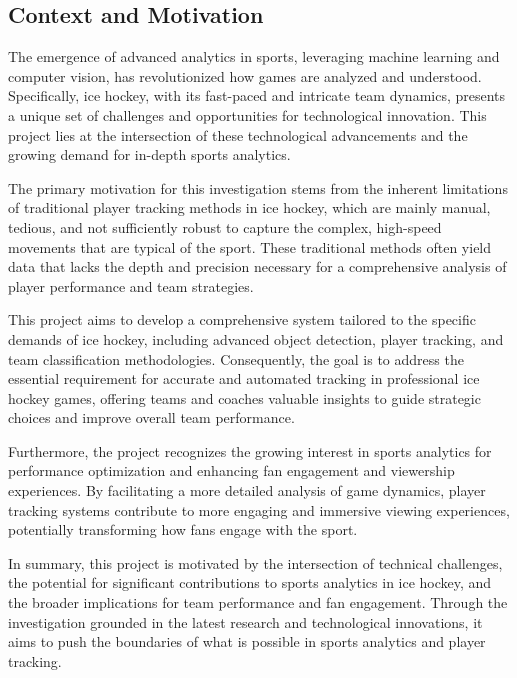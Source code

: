 \documentclass[12pt, letterpaper]{article}
\begin{document}
{
\setlength{\parskip}{0.3cm}
\subsection{Context and Motivation}
\begin{spacing}{1.2}
The emergence of advanced analytics in sports, leveraging machine learning and computer vision, has revolutionized how games are analyzed and understood. Specifically, ice hockey, with its fast-paced and intricate team dynamics, presents a unique set of challenges and opportunities for technological innovation. This project lies at the intersection of these technological advancements and the growing demand for in-depth sports analytics.

The primary motivation for this investigation stems from the inherent limitations of traditional player tracking methods in ice hockey, which are mainly manual, tedious, and not sufficiently robust to capture the complex, high-speed movements that are typical of the sport. These traditional methods often yield data that lacks the depth and precision necessary for a comprehensive analysis of player performance and team strategies.


This project aims to develop a comprehensive system tailored to the specific demands of ice hockey, including advanced object detection, player tracking, and team classification methodologies. Consequently, the goal is to address the essential requirement for accurate and automated tracking in professional ice hockey games, offering teams and coaches valuable insights to guide strategic choices and improve overall team performance.

Furthermore, the project recognizes the growing interest in sports analytics for performance optimization and enhancing fan engagement and viewership experiences. By facilitating a more detailed analysis of game dynamics, player tracking systems contribute to more engaging and immersive viewing experiences, potentially transforming how fans engage with the sport.

In summary, this project is motivated by the intersection of technical challenges, the potential for significant contributions to sports analytics in ice hockey, and the broader implications for team performance and fan engagement. Through the investigation grounded in the latest research and technological innovations, it aims to push the boundaries of what is possible in sports analytics and player tracking.
\end{spacing}
}
\newpage
\end{document}
